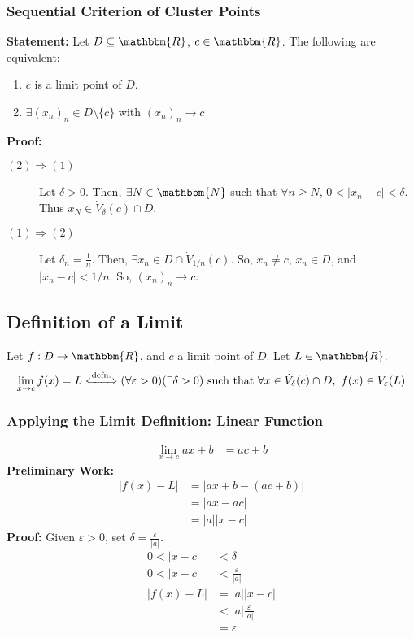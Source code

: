 \documentclass[10pt]{extarticle}
\newcommand{\N}{\mathbbm{N}}
\newcommand{\R}{\mathbbm{R}}
\begin{document}
    \subsubsection{Sequential Criterion of Cluster Points}%
    \textbf{Statement:} Let $D\subseteq \R$, $c\in\R$. The following are equivalent:
    \begin{enumerate}[(1)]
      \item $c$ is a limit point of $D$.
      \item $\exists (x_n)_n \in D\setminus \{c\}$ with $(x_n)_n \rightarrow c$
    \end{enumerate}
    \textbf{Proof:}
    \begin{description}
      \item[$(2) \Rightarrow (1)$] Let $\delta > 0$. Then, $\exists N\in\N$ such that $\forall n\geq N$, $0 < |x_n - c| < \delta$. Thus $x_{N} \in \dot{V}_{\delta}(c) \cap D$.
      \item[$(1) \Rightarrow (2)$] Let $\delta_n = \frac{1}{n}$. Then, $\exists x_n \in D \cap \dot{V}_{1/n}(c)$. So, $x_n \neq c$, $x_n\in D$, and $|x_n - c| < 1/n$. So, $(x_n)_n \rightarrow c$.
    \end{description}
  \subsection{Definition of a Limit}%
    Let $f: D\rightarrow \R$, and $c$ a limit point of $D$. Let $L \in \R$.
    \begin{align*}
      \lim_{x\rightarrow c} f(x) = L \xLeftrightarrow{\text{defn.}} (\forall \varepsilon > 0)(\exists \delta > 0) \text{ such that } \forall x\in \dot{V}_{\delta}(c)\cap D,~f(x)\in V_{\varepsilon}(L)
    \end{align*}
    \subsubsection{Applying the Limit Definition: Linear Function}%
    \begin{align*}
      \lim_{x\rightarrow c}ax + b &= ac + b \tag*{$a \neq 0$}
    \end{align*}
    \textbf{Preliminary Work:}
    \begin{align*}
      |f(x) - L| &= |ax + b - (ac + b)|\\
                 &= |ax - ac|\\
                 &= |a||x-c|
    \end{align*}
    \textbf{Proof:} Given $\varepsilon > 0$, set $\delta = \frac{\varepsilon}{|a|}$.
    \begin{align*}
      0 < |x-c| &< \delta \\
      0 < |x-c| &< \frac{\varepsilon}{|a|}\\
      |f(x) - L| &= |a| |x-c|\\
                 &< |a| \frac{\varepsilon}{|a|}\\
                &= \varepsilon
    \end{align*}
\end{document}
